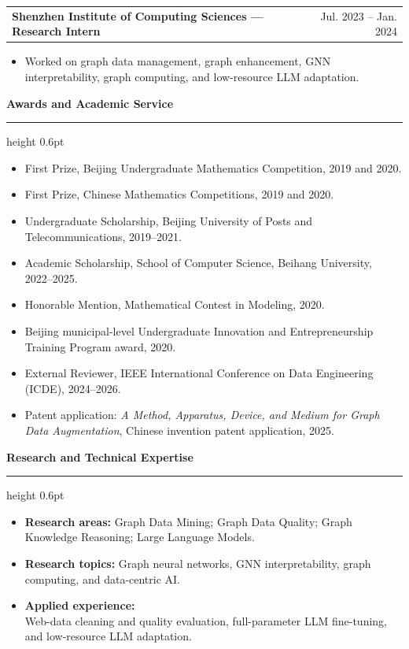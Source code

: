 \documentclass[10pt,a4paper]{article}
\makeatletter
\newcommand{\dateRange}[2]{\textcolor{muted}{#1 -- #2}}
\newcommand{\datedline}[2]{%
  \begin{tabularx}{\textwidth}{@{}Xr@{}}
    \textbf{#1} & #2
  \end{tabularx}\vspace{0.05em}
}
\newcommand{\logosection}[2]{%
  \vspace{0.7em}
  {\large\bfseries\color{heading}\makebox[1.35em][c]{#1}\hspace{0.25em}#2}\par
  \vspace{0.18em}
  {\color{rulecolor}\hrule height 0.6pt}
  \vspace{0.38em}
}
\makeatother
\begin{document}
\datedline{Shenzhen Institute of Computing Sciences — Research Intern}{\dateRange{Jul. 2023}{Jan. 2024}}
\begin{itemize}
  \item Worked on graph data management, graph enhancement, GNN interpretability, graph computing, and low-resource LLM adaptation.
\end{itemize}

\logosection{\faAward}{Awards and Academic Service}

\begin{itemize}
  \item First Prize, Beijing Undergraduate Mathematics Competition, 2019 and 2020.
  \item First Prize, Chinese Mathematics Competitions, 2019 and 2020.
  \item Undergraduate Scholarship, Beijing University of Posts and Telecommunications, 2019--2021.
  \item Academic Scholarship, School of Computer Science, Beihang University, 2022--2025.
  \item Honorable Mention, Mathematical Contest in Modeling, 2020.
  \item Beijing municipal-level Undergraduate Innovation and Entrepreneurship Training Program award, 2020.
  \item External Reviewer, IEEE International Conference on Data Engineering (ICDE), 2024--2026.
  \item Patent application: \textit{A Method, Apparatus, Device, and Medium for Graph Data Augmentation}, Chinese invention patent application, 2025.
\end{itemize}

\logosection{\faTools}{Research and Technical Expertise}

\begin{itemize}
  \item \textbf{Research areas:} Graph Data Mining; Graph Data Quality; Graph Knowledge Reasoning; Large Language Models.
  \item \textbf{Research topics:} Graph neural networks, GNN interpretability, graph computing, and data-centric AI.
  \item \textbf{Applied experience:}\\
    Web-data cleaning and quality evaluation, full-parameter LLM fine-tuning, and low-resource LLM adaptation.
\end{itemize}

\newpage
\end{document}
